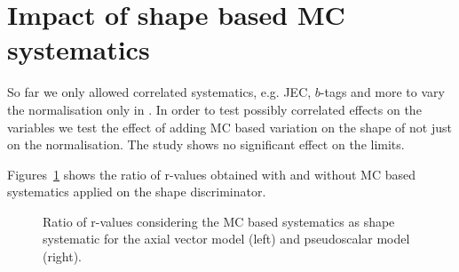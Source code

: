 \section{Impact of shape based MC systematics} \label{app:sec_mc_based}

So far we only allowed correlated systematics, e.g. JEC, $b$-tags and more to vary the normalisation only in \MHT. 
In order to test possibly correlated effects on the \MHT variables we test the effect of adding MC based variation on the shape of \MHT not just on the normalisation. The study shows no significant effect on the limits. 


Figures~\ref{fig:mht_shape} shows the ratio of r-values obtained with and without MC based systematics applied on the \MHT shape discriminator. 

\begin{figure}[h!] \centering
  \caption{Ratio of r-values considering the MC based systematics as shape systematic for the axial vector model (left) and pseudoscalar model (right).}
\label{fig:mht_shape} 
\end{figure}

